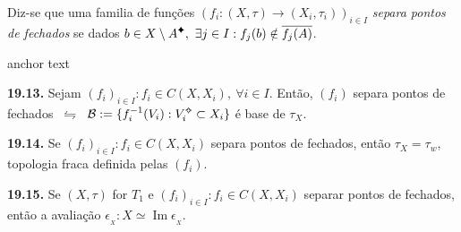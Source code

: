 \begin{definition}
    Diz-se que uma familia de funções \((f_i: (X,\tau) \to (X_i, \tau_i))_{i\in I}\) \emph{separa pontos de fechados} se dados \(b \in X \setminus A\ce, \ \exists j \in I : f_j(b) \notin  \overline{f_j(A)}\). 
\end{definition}

\hypertarget{prop1913}{anchor text}
\begin{proposition}
    \textbf{19.13.} Sejam \((f_i)_{i\in I} : f_i \in C(X, X_i), \ \forall i \in I\). Então, \((f_i)\) separa pontos de fechados \(\ \leftrightharpoons \ \) \(\B:= \{f_i^{-1}(V_i) : V_i\ab \subset X_i\}\) é base de  \(\tau_X\). 
\end{proposition}


\hypertarget{coro1914}{}
\begin{corollary}
    \textbf{19.14.} Se \((f_i)_{i\in I} : f_i \in C(X, X_i)\) separa pontos de fechados, então \(\tau_X = \tau_w\), topologia fraca definida pelas \((f_i)\). 
\end{corollary}

\begin{corollary}
    \textbf{19.15.} Se \((X, \tau)\) for \(T_1\) e \((f_i)_{i\in I} : f_i \in C(X, X_i)\) separar pontos de fechados, então a avaliação \(\epsilon_{_X} : X \simeq \operatorname{Im}\epsilon_{_X}\). 
\end{corollary}
